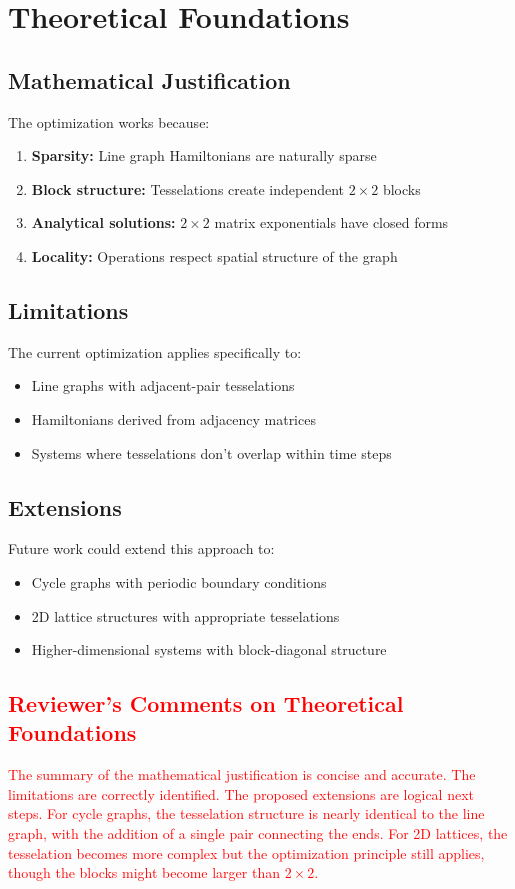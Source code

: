 \documentclass[11pt,a4paper]{article}
\begin{document}
\section{Theoretical Foundations}

\subsection{Mathematical Justification}

The optimization works because:
\begin{enumerate}
\item \textbf{Sparsity:} Line graph Hamiltonians are naturally sparse
\item \textbf{Block structure:} Tesselations create independent $2\times2$ blocks
\item \textbf{Analytical solutions:} $2\times2$ matrix exponentials have closed forms
\item \textbf{Locality:} Operations respect spatial structure of the graph
\end{enumerate}

\subsection{Limitations}

The current optimization applies specifically to:
\begin{itemize}
\item Line graphs with adjacent-pair tesselations
\item Hamiltonians derived from adjacency matrices
\item Systems where tesselations don't overlap within time steps
\end{itemize}

\subsection{Extensions}

Future work could extend this approach to:
\begin{itemize}
\item Cycle graphs with periodic boundary conditions
\item 2D lattice structures with appropriate tesselations
\item Higher-dimensional systems with block-diagonal structure
\end{itemize}

\textcolor{red}{
\subsection*{Reviewer's Comments on Theoretical Foundations}
The summary of the mathematical justification is concise and accurate. The limitations are correctly identified. The proposed extensions are logical next steps. For cycle graphs, the tesselation structure is nearly identical to the line graph, with the addition of a single pair connecting the ends. For 2D lattices, the tesselation becomes more complex but the optimization principle still applies, though the blocks might become larger than $2 \times 2$.
}
\end{document}
